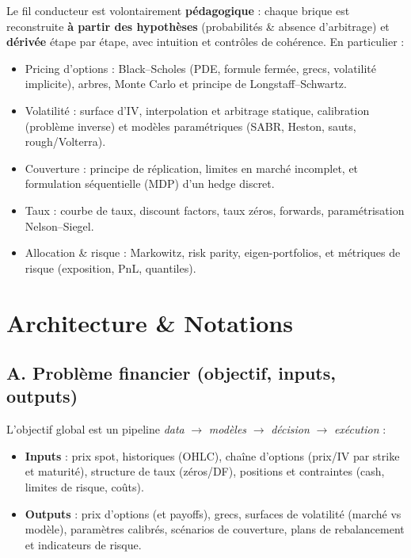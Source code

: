 \documentclass[11pt,a4paper]{report}
\theoremstyle{definition}
\theoremstyle{plain}
\theoremstyle{remark}
\newcommand{\1}{\mathbf{1}}
\begin{document}
Le fil conducteur est volontairement \textbf{pédagogique} : chaque brique est reconstruite \textbf{à partir des hypothèses} (probabilités \& absence d'arbitrage) et \textbf{dérivée} étape par étape, avec intuition et contrôles de cohérence. En particulier :
\begin{itemize}[leftmargin=*]
\item Pricing d'options : Black--Scholes (PDE, formule fermée, grecs, volatilité implicite), arbres, Monte Carlo et principe de Longstaff--Schwartz.
\item Volatilité : surface d'IV, interpolation et arbitrage statique, calibration (problème inverse) et modèles paramétriques (SABR, Heston, sauts, rough/Volterra).
\item Couverture : principe de réplication, limites en marché incomplet, et formulation séquentielle (MDP) d'un hedge discret.
\item Taux : courbe de taux, discount factors, taux zéros, forwards, paramétrisation Nelson--Siegel.
\item Allocation \& risque : Markowitz, risk parity, eigen-portfolios, et métriques de risque (exposition, PnL, quantiles).
\end{itemize}

\tableofcontents
\listoffigures

\setcounter{chapter}{-1}
\chapter{Architecture \& Notations}

\section{A. Problème financier (objectif, inputs, outputs)}
L'objectif global est un pipeline \emph{data} $\to$ \emph{modèles} $\to$ \emph{décision} $\to$ \emph{exécution} :
\begin{itemize}[leftmargin=*]
\item \textbf{Inputs} : prix spot, historiques (OHLC), chaîne d'options (prix/IV par strike et maturité), structure de taux (zéros/DF), positions et contraintes (cash, limites de risque, coûts).
\item \textbf{Outputs} : prix d'options (et payoffs), grecs, surfaces de volatilité (marché vs modèle), paramètres calibrés, scénarios de couverture, plans de rebalancement et indicateurs de risque.
\end{itemize}
\end{document}

